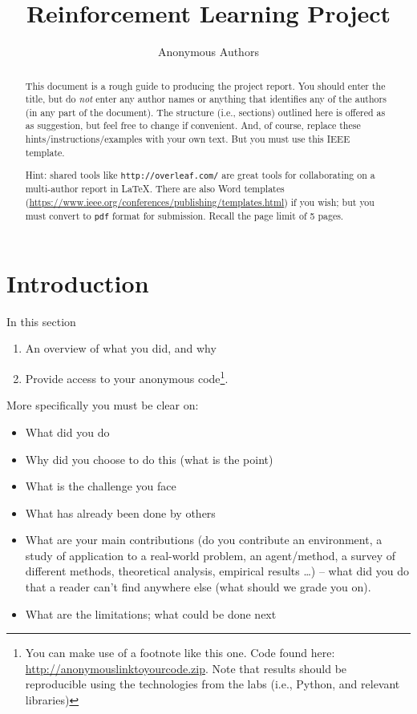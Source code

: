 \documentclass[journal, a4paper]{IEEEtran}
\begin{document}
\title{Reinforcement Learning Project}
\author{Anonymous Authors}
\maketitle

\begin{abstract}
	This document is a rough guide to producing the project report. You should enter the title, but do \emph{not} enter any author names or anything that identifies any of the authors (in any part of the document). 
	The structure (i.e., sections) outlined here is offered as as suggestion, but feel free to change if convenient. And, of course, replace these hints/instructions/examples with your own text. But you must use this IEEE template. 
	
Hint: shared tools like \texttt{http://overleaf.com/} are great tools for collaborating on a multi-author report in \LaTeX. There are also Word templates (\url{https://www.ieee.org/conferences/publishing/templates.html}) if you wish; but you must convert to \texttt{pdf} format for submission. Recall the page limit of 5 pages.  
\end{abstract}

\section{Introduction}
\label{sec:intro}

In this section
\begin{enumerate}
	\item An overview of what you did, and why
	\item Provide access to your anonymous code\footnote{You can make use of a footnote like this one. Code found here: \url{http://anonymouslinktoyourcode.zip}. Note that results should be reproducible using the technologies from the labs (i.e., Python, and relevant libraries)}. 
\end{enumerate}

More specifically you must be clear on: 
\begin{itemize}
	\item What did you do%
	\item Why did you choose to do this (what is the point)
	\item What is the challenge you face
	\item What has already been done by others
	\item What are your main contributions (do you contribute an environment, a study of application to a real-world problem, an agent/method, a survey of different methods, theoretical analysis, empirical results \ldots) -- what did you do that a reader can't find anywhere else (what should we grade you on).
	\item What are the limitations; what could be done next
\end{itemize}
\end{document}
